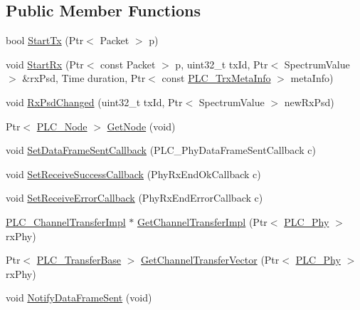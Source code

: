 \subsection*{\-Public \-Member \-Functions}
\begin{DoxyCompactItemize}
\item 
bool \hyperlink{classns3_1_1PLC__Phy_a4087fbae09bdb778285c0e7cdc307d2e}{\-Start\-Tx} (\-Ptr$<$ \-Packet $>$ p)
\item 
void \hyperlink{classns3_1_1PLC__Phy_abe32cc0f1c2e7c9de36a37812423df8e}{\-Start\-Rx} (\-Ptr$<$ const \-Packet $>$ p, uint32\-\_\-t tx\-Id, \-Ptr$<$ \-Spectrum\-Value $>$ \&rx\-Psd, \-Time duration, \-Ptr$<$ const \hyperlink{classns3_1_1PLC__TrxMetaInfo}{\-P\-L\-C\-\_\-\-Trx\-Meta\-Info} $>$ meta\-Info)
\item 
void \hyperlink{classns3_1_1PLC__Phy_a37c13147b5d5cb71843be91c1654fc18}{\-Rx\-Psd\-Changed} (uint32\-\_\-t tx\-Id, \-Ptr$<$ \-Spectrum\-Value $>$ new\-Rx\-Psd)
\item 
\-Ptr$<$ \hyperlink{classns3_1_1PLC__Node}{\-P\-L\-C\-\_\-\-Node} $>$ \hyperlink{classns3_1_1PLC__Phy_ac671d3c0e8fbe3792f4ee16e7f8998a2}{\-Get\-Node} (void)
\item 
void \hyperlink{classns3_1_1PLC__Phy_a970811df6124983c58f6b578a986f336}{\-Set\-Data\-Frame\-Sent\-Callback} (\-P\-L\-C\-\_\-\-Phy\-Data\-Frame\-Sent\-Callback c)
\item 
void \hyperlink{classns3_1_1PLC__Phy_abd23f344001a334bc6b2981e1f9e096d}{\-Set\-Receive\-Success\-Callback} (\-Phy\-Rx\-End\-Ok\-Callback c)
\item 
void \hyperlink{classns3_1_1PLC__Phy_a67ae8c7bf4a78a5788408f507b179bcc}{\-Set\-Receive\-Error\-Callback} (\-Phy\-Rx\-End\-Error\-Callback c)
\item 
\hyperlink{classns3_1_1PLC__ChannelTransferImpl}{\-P\-L\-C\-\_\-\-Channel\-Transfer\-Impl} $\ast$ \hyperlink{classns3_1_1PLC__Phy_a2901b7bc2979a2637c665c5501ef6d4a}{\-Get\-Channel\-Transfer\-Impl} (\-Ptr$<$ \hyperlink{classns3_1_1PLC__Phy}{\-P\-L\-C\-\_\-\-Phy} $>$ rx\-Phy)
\item 
\-Ptr$<$ \hyperlink{classns3_1_1PLC__ValueBase}{\-P\-L\-C\-\_\-\-Transfer\-Base} $>$ \hyperlink{classns3_1_1PLC__Phy_a5c9c1582a62bd748c8b09b294eb95a83}{\-Get\-Channel\-Transfer\-Vector} (\-Ptr$<$ \hyperlink{classns3_1_1PLC__Phy}{\-P\-L\-C\-\_\-\-Phy} $>$ rx\-Phy)
\item 
void \hyperlink{classns3_1_1PLC__Phy_a51e432fe0945a6b810e0f5d240b2ff55}{\-Notify\-Data\-Frame\-Sent} (void)
\end{DoxyCompactItemize}
